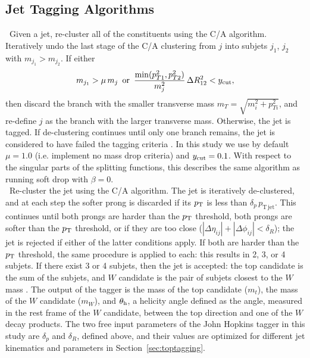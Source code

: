  
 
\subsection{Jet Tagging Algorithms}
\label{sec:taggers}

~Given a jet, re-cluster all of the constituents using the C/A algorithm. Iteratively undo the last stage of the C/A clustering from $j$ into subjets $j_1$, $j_2$ with $m_{j_1}>m_{j_2}$. If either
%
\begin{equation}
m_{j_1} > \mu \, m_j\,\,\,\mathrm{or}\,\,\, \frac{\mathrm{min}(p_{T1}^2,p_{T2}^2)}{m_j^2}\,\Delta R_{12}^2 < y_{\rm cut},
\end{equation}
%
then discard the branch with the smaller transverse mass $m_T = \sqrt{m_i^2 + p_{Ti}^2}$, and re-define $j$ as the branch with the larger transverse mass. Otherwise, the jet is tagged. If de-clustering continues until only one branch remains, the jet is considered to have failed the tagging criteria \cite{Dasgupta:2013ihk}. In this study we use by default $\mu = 1.0$ (i.e. implement no mass drop criteria) and $y_{\rm cut} = 0.1$. With respect to the singular parts of the splitting functions, this describes the same algorithm as running soft drop with $\beta = 0$. \\


~Re-cluster the jet using the C/A algorithm. The jet is iteratively de-clustered, and at each step the softer prong is discarded if its $p_{\rm T}$ is less than $\delta_p\,p_{\mathrm{T\,jet}}$. This continues until both prongs are harder than the $p_{\rm T}$ threshold, both prongs are softer than the $p_{\rm T}$ threshold, or if they are too close ($|\Delta\eta_{ij}|+|\Delta\phi_{ij}|<\delta_R$); the jet is rejected if either of the latter conditions apply. If both are harder than the $p_{\rm T}$ threshold, the same procedure is applied to each: this results in 2, 3, or 4 subjets. If there exist 3 or 4 subjets, then the jet is accepted: the top candidate is the sum of the subjets, and $W$ candidate is the pair of subjets closest to the $W$ mass \cite{Kaplan:2008ie}. The output of the tagger is the mass of the top candidate ($m_t$), the mass of the $W$ candidate ($m_W$), and $\theta_{\rm h}$, a helicity angle defined as the angle, measured in the rest frame of the $W$ candidate, between the top direction and one of the $W$ decay products. The two free input parameters of the John Hopkins tagger in this study are $\delta_p$ and $\delta_R$, defined above, and their values are optimized for different jet kinematics and parameters in Section~\ref{sec:toptagging}.\\

